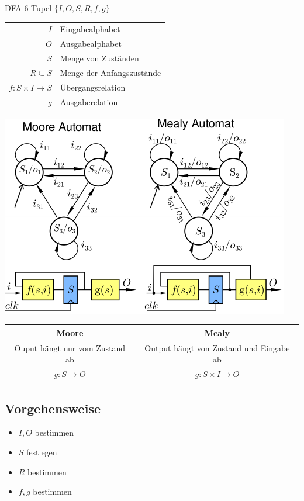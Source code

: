 \documentclass[6pt,a4paper]{scrartcl}
\newcommand{\eset}[1]{\ensuremath{\bigl\{#1\bigr\}}}								%
\newcommand{\ra}[0]{\ensuremath{\rightarrow}} 									%
\begin{document}
\begin{multicols}{3}
DFA 6-Tupel $\eset{I, O, S, R, f, g}$ \\

\begin{tabular}{r | l} 
$I$ & Eingabealphabet \\
$O$ &  Ausgabealphabet \\
$S$ & Menge von Zuständen \\
$R \subseteq S$ &  Menge der Anfangszustände \\
$f: S \times I \ra S$  &  Übergangsrelation \\
$g$ & Ausgaberelation \\
\end{tabular}

\includegraphics{img/ds/automaten.pdf}\\


\begin{tabular}{c | c}
 Moore & Mealy \\ \midrule
 Ouput hängt nur vom Zustand ab & Output hängt von Zustand und Eingabe ab\\
 $g: S \ra O$ & $g: S \times I \ra O$
\end{tabular}

\subsection{Vorgehensweise} %
\begin{itemize}
	\item $I, O$ bestimmen
	\item $S$ festlegen 
	\item $R$ bestimmen
	\item $f,g$ bestimmen
\end{itemize}

\end{multicols}
\end{document}
